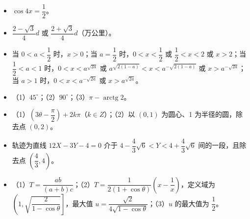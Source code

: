 \begin{itemize}[leftmargin=2.6em]
  \item[\textbf{21.}] $\cos 4x=\dfrac{1}{2}$。
  \item[\textbf{22.}] $\dfrac{2-\sqrt{3}}{4}d$ 或 $\dfrac{2+\sqrt{3}}{4}d$（万公里）。
  \item[\textbf{23.}] 当 $0<a<\dfrac{1}{2}$ 时，$x>0$；当 $a=\dfrac{1}{2}$ 时，$0<x<\dfrac{1}{2}$ 或 $\dfrac{1}{2}<x<2$ 或 $x>2$；当 $\dfrac{1}{2}<a<1$ 时，$0<x<a^{\sqrt{2a}}$ 或 $a^{\sqrt{2(1-a)}}<x<a^{-\sqrt{2(1-a)}}$ 或 $x>a^{-\sqrt{2a}}$；当 $a>1$ 时，$0<x<a^{-\sqrt{2a}}$ 或 $x>a^{\sqrt{2a}}$。
  \item[\textbf{24.}] （1）$45^{\circ}$；（2）$90^{\circ}$；（3）$\pi-\operatorname{arctg}2$。
  \item[\textbf{25.}] （1）$\left(3\theta-\dfrac{\pi}{2}\right)+2k\pi$（$k\in Z$）；（2）以 $(0,1)$ 为圆心、1 为半径的圆，除去点 $(0,2)$。
  \item[\textbf{26.}] 轨迹为直线 $12X-3Y-4=0$ 介于 $4-\dfrac{4}{3}\sqrt{6}<Y<4+\dfrac{4}{3}\sqrt{6}$ 间的一段，且除去点 $\left(\dfrac{4}{3},4\right)$。
  \item[\textbf{27.}] （1）$T=\dfrac{ab}{(a+b)c}$；（2）$T=\dfrac{1}{2(1+\cos\theta)}\left(x-\dfrac{1}{x}\right)$，定义域为 $\left(1,\sqrt{\dfrac{2}{1-\cos\theta}}\right]$，最大值 $u=\dfrac{\sqrt{2}}{4\sqrt{1-\cos\theta}}$；（3）$u$ 的最大值为 $\dfrac{1}{2}$。
\end{itemize}
